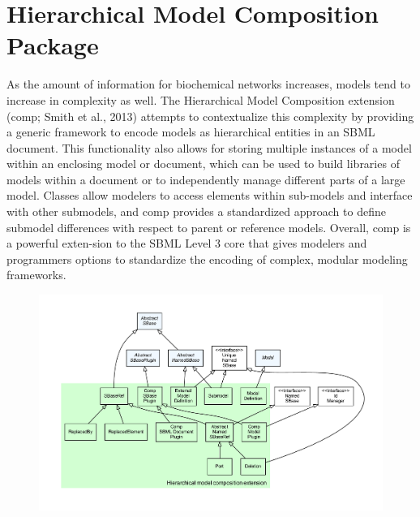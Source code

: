 \section{Hierarchical Model Composition Package}
\label{sec:comp-overview}
As the amount of information for biochemical networks increases, models tend to
increase in complexity as well. The Hierarchical Model Composition extension (comp; Smith et al., 2013)
attempts to contextualize this complexity by providing a generic framework to encode
models as hierarchical entities in an SBML document. This functionality also allows
for storing multiple instances of a model within an enclosing model or document, which
can be used to build libraries of models within a document or to independently manage
different parts of a large model. Classes allow modelers to access elements within
sub-models and interface with other submodels, and comp provides a standardized approach
to define submodel differences with respect to parent or reference models. Overall, comp
is a powerful exten-sion to the SBML Level 3 core that gives modelers and programmers
options to standardize the encoding of complex, modular modeling frameworks. 

\begin{figure}[hb]
 \centering
 \vspace*{2ex}
 \includegraphics[width=\textwidth]{../../../extensions/comp/doc/img/type_hierarchy.pdf}
 \caption[The hierarchical model composition extension]{}
 \label{fig:comp}
\end{figure}

